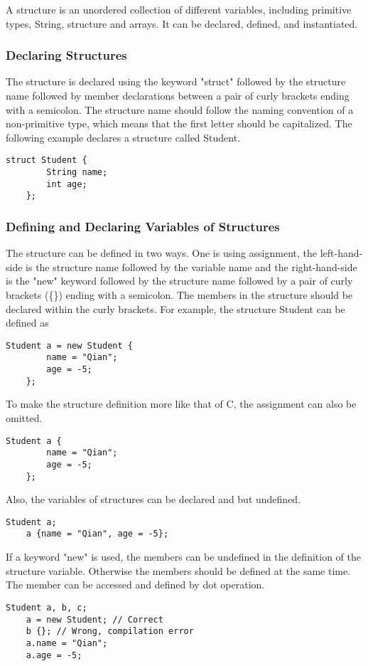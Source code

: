 A structure is an unordered collection of different variables, including primitive types, String, structure and arrays. It can be declared, defined, and instantiated.
\subsubsection{Declaring Structures}
The structure is declared using the keyword "struct" followed by the structure name followed by member declarations between a pair of curly brackets ending with a semicolon. The structure name should follow the naming convention of a non-primitive type, which means that the first letter should be capitalized. The following example declares a structure called Student.
\begin{lstlisting}[caption={struct\_declaration.csm}, captionpos=b]
    struct Student {
        String name;
        int age;
    };
\end{lstlisting}

\subsubsection{Defining and Declaring Variables of Structures}
The structure can be defined in two ways. One is using assignment, the left-hand-side is the structure name followed by the variable name and the right-hand-side is the "new" keyword followed by the structure name followed by a pair of curly brackets (\{\}) ending with a semicolon. The members in the structure should be declared within the curly brackets. For example, the structure Student can be defined as
\begin{lstlisting}[caption={struct\_definition.csm}, captionpos=b]
    Student a = new Student {
        name = "Qian";
        age = -5;
    };
\end{lstlisting}
To make the structure definition more like that of C, the assignment can also be omitted.
\begin{lstlisting}[caption={struct\_definition.csm}, captionpos=b]
    Student a {
        name = "Qian";
        age = -5;
    };
\end{lstlisting}
Also, the variables of structures can be declared and but undefined.
\begin{lstlisting}[caption={struct\_definition.csm}, captionpos=b]
    Student a;
    a {name = "Qian", age = -5};
\end{lstlisting}
If a keyword "new" is used, the members can be undefined in the definition of the structure variable. Otherwise the members should be defined at the same time. The member can be accessed and defined by dot operation.
\begin{lstlisting}[caption={struct\_definition.csm}, captionpos=b]
    Student a, b, c;
    a = new Student; // Correct
    b {}; // Wrong, compilation error
    a.name = "Qian";
    a.age = -5;
\end{lstlisting}

